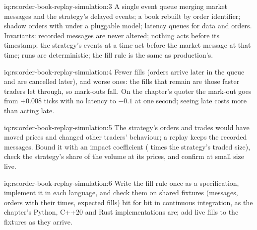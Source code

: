 \begin{solution}{iq:rs:order-book-replay-simulation:3}
A single event queue merging market messages and the strategy's delayed events; a book rebuilt by order identifier; shadow orders with  under a
pluggable model; latency queues for data and orders. Invariants: recorded messages are never altered; nothing acts before its timestamp; the strategy's events at a
time act before the market message at that time; runs are deterministic; the fill rule is the same as production's.
\end{solution}

\begin{solution}{iq:rs:order-book-replay-simulation:4}
Fewer fills (orders arrive later in the queue and are cancelled later), and worse ones: the fills that remain are those faster traders let through, so mark-outs fall.
On the chapter's quoter the mark-out goes from $+0.008$ ticks with no latency to $-0.1$ at one second; seeing late costs more than acting late.
\end{solution}

\begin{solution}{iq:rs:order-book-replay-simulation:5}
The strategy's orders and trades would have moved prices and changed other traders' behaviour; a replay keeps the recorded messages. Bound it with an impact
coefficient ( times the strategy's traded size), check the strategy's share of the volume at its prices, and confirm at small size live.
\end{solution}

\begin{solution}{iq:rs:order-book-replay-simulation:6}
Write the fill rule once as a specification, implement it in each language, and check them on shared fixtures (messages, orders with their times, expected fills)
bit for bit in continuous integration, as the chapter's Python, C++20 and Rust implementations are; add live fills to the fixtures as they arrive.
\end{solution}

